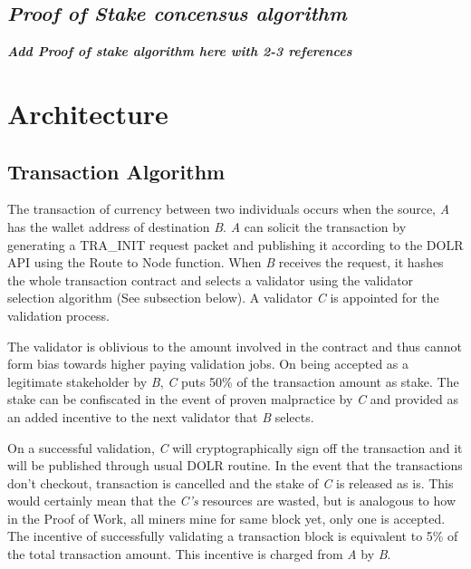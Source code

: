 \documentclass[conference,a4paper,12pt]{IEEEtran}
\begin{document}
\subsection{\textit{Proof of Stake concensus algorithm}}
\textit{\textbf{Add Proof of stake algorithm here with 2-3 references}}

\section{Architecture}
	\subsection{Transaction Algorithm}

	The transaction of currency between two individuals occurs when the source, \textit{A} has the wallet address of destination \textit{B}. \textit{A} can solicit the transaction by generating a TRA\_INIT request packet and publishing it according to the DOLR API \cite{tapestry_dolr} using the Route to Node function. When \textit{B} receives the request, it hashes the whole transaction contract and selects a validator using the validator selection algorithm (See subsection below). A validator \textit{C} is appointed for the validation process.

	The validator is oblivious to the amount involved in the contract and thus cannot form bias towards higher paying validation jobs. On being accepted as a legitimate stakeholder by \textit{B}, \textit{C} puts 50\% of the transaction amount as stake. The stake can be confiscated in the event of proven malpractice by \textit{C} and provided as an added incentive to the next validator that \textit{B} selects.

	On a successful validation, \textit{C} will cryptographically sign off the transaction and it will be published through usual DOLR \cite{tapestry_dolr} routine. In the event that the transactions don't checkout, transaction is cancelled and the stake of \textit{C} is released as is. This would certainly mean that the \textit{C's} resources are wasted, but is analogous to how in the Proof of Work, all miners mine for same block yet, only one is accepted. The incentive of successfully validating a transaction block is equivalent to 5\% of the total transaction amount. This incentive is charged from \textit{A} by \textit{B}.
\end{document}
